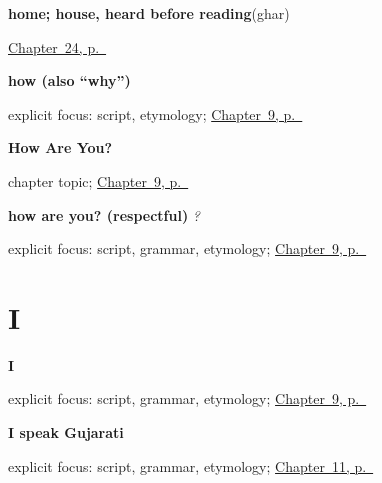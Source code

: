 \noindent\begin{minipage}[t]{\linewidth}
\raggedright
\textbf{home; house, heard before reading}\enspace\emph{}\enspace(ghar)\par
\footnotesize \hyperref[ch:gu-first-three-places]{Chapter~24, p.~\pageref*{ch:gu-first-three-places}}
\end{minipage}\par\smallskip

\noindent\begin{minipage}[t]{\linewidth}
\raggedright
\textbf{how (also \textquotedblleft{}why\textquotedblright{})}\enspace\emph{}\par
\footnotesize explicit focus: script, etymology; \hyperref[ch:responding]{Chapter~9, p.~\pageref*{ch:responding}}
\end{minipage}\par\smallskip

\noindent\begin{minipage}[t]{\linewidth}
\raggedright
\textbf{How Are You?}\par
\footnotesize chapter topic; \hyperref[ch:responding]{Chapter~9, p.~\pageref*{ch:responding}}
\end{minipage}\par\smallskip

\noindent\begin{minipage}[t]{\linewidth}
\raggedright
\textbf{how are you? (respectful)}\enspace\emph{  ?}\par
\footnotesize explicit focus: script, grammar, etymology; \hyperref[ch:responding]{Chapter~9, p.~\pageref*{ch:responding}}
\end{minipage}\par\smallskip

\section*{I}

\noindent\begin{minipage}[t]{\linewidth}
\raggedright
\textbf{I}\enspace\emph{}\par
\footnotesize explicit focus: script, grammar, etymology; \hyperref[ch:responding]{Chapter~9, p.~\pageref*{ch:responding}}
\end{minipage}\par\smallskip

\noindent\begin{minipage}[t]{\linewidth}
\raggedright
\textbf{I speak Gujarati}\enspace\emph{   }\par
\footnotesize explicit focus: script, grammar, etymology; \hyperref[ch:first-verbs]{Chapter~11, p.~\pageref*{ch:first-verbs}}
\end{minipage}\par\smallskip

